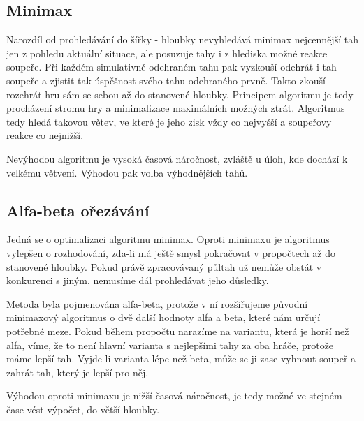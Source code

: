 \documentclass[a4paper,11pt,titlepage]{article}
\begin{document}
\subsection{Minimax}
Narozdíl od prohledávání do šířky - hloubky nevyhledává minimax nejcennější tah jen z pohledu aktuální situace, ale posuzuje tahy i z hlediska možné reakce soupeře. Při každém simulativně odehraném tahu pak vyzkouší odehrát i tah soupeře a zjistit tak úspěšnost svého tahu odehraného prvně. Takto zkouší rozehrát hru sám se sebou až do stanovené hloubky. Principem algoritmu je tedy procházení stromu hry a minimalizace maximálních možných ztrát. Algoritmus tedy hledá takovou větev, ve které je jeho zisk vždy co nejvyšší a soupeřovy reakce co nejnižší.

Nevýhodou algoritmu je vysoká časová náročnost, zvláště u úloh, kde dochází k velkému větvení. Výhodou pak volba výhodnějších tahů.

\subsection{Alfa-beta ořezávání}
Jedná se o optimalizaci algoritmu minimax. Oproti minimaxu je algoritmus vylepšen o rozhodování, zda-li má ještě smysl pokračovat v propočtech až do stanovené hloubky. Pokud právě zpracovávaný půltah už nemůže obstát v konkurenci s jiným, nemusíme dál prohledávat jeho důsledky.

Metoda byla pojmenována alfa-beta, protože v ní rozšiřujeme původní minimaxový algoritmus o dvě další hodnoty alfa a beta, které nám určují potřebné meze. Pokud během propočtu narazíme na variantu, která je horší než alfa, víme, že to není hlavní varianta s nejlepšími tahy za oba hráče, protože máme lepší tah. Vyjde-li varianta lépe než beta, může se ji zase vyhnout soupeř a zahrát tah, který je lepší pro něj. 

Výhodou oproti minimaxu je nižší časová náročnost, je tedy možné ve stejném čase vést výpočet, do větší hloubky.
\end{document}
